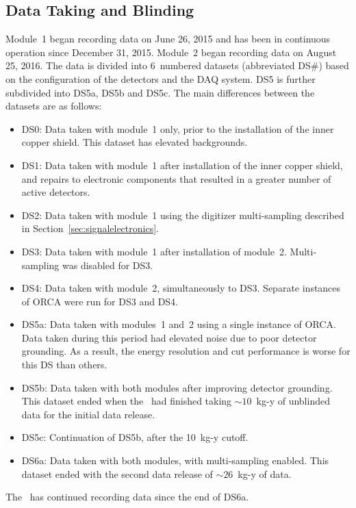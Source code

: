 \documentclass[/main.tex]{subfiles}
\begin{document}
\subsection{Data Taking and Blinding}
Module~1 began recording data on June 26, 2015 and has been in continuous operation since December 31, 2015.
Module~2 began recording data on August 25, 2016.
The data is divided into 6~numbered datasets (abbreviated DS\#) based on the configuration of the detectors and the DAQ system.
DS5 is further subdivided into DS5a, DS5b and DS5c.
The main differences between the datasets are as follows:
\begin{itemize}
\item DS0: Data taken with module~1 only, prior to the installation of the inner copper shield. This dataset has elevated backgrounds.
\item DS1: Data taken with module~1 after installation of the inner copper shield, and repairs to electronic components that resulted in a greater number of active detectors.
\item DS2: Data taken with module~1 using the digitizer multi-sampling described in Section~\ref{sec:signalelectronics}.
\item DS3: Data taken with module~1 after installation of module~2. Multi-sampling was disabled for DS3.
\item DS4: Data taken with module~2, simultaneously to DS3. Separate instances of ORCA were run for DS3 and DS4.
\item DS5a: Data taken with modules~1 and~2 using a single instance of ORCA. Data taken during this period had elevated noise due to poor detector grounding. As a result, the energy resolution and cut performance is worse for this DS than others.
\item DS5b: Data taken with both modules after improving detector grounding. This dataset ended when the \MJD\ had finished taking ${\sim}10$~kg-y of unblinded data for the initial data release.
\item DS5c: Continuation of DS5b, after the 10~kg-y cutoff.
\item DS6a: Data taken with both modules, with multi-sampling enabled. This dataset ended with the second data release of ${\sim}26$~kg-y of data.
\end{itemize}
The \MJD\ has continued recording data since the end of DS6a.
\end{document}
